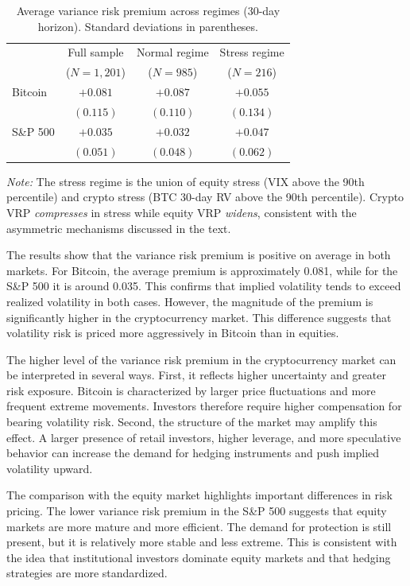 \documentclass[11pt,a4paper,openany]{report}
\begin{document}
\begin{table}[H]
\centering
\caption{Average variance risk premium across regimes (30-day horizon). Standard deviations in parentheses.}
\label{tab:vrp}
\begin{tabular}{lccc}
\toprule
& Full sample & Normal regime & Stress regime \\
& ($N=1{,}201$) & ($N=985$) & ($N=216$) \\
\midrule
Bitcoin   & $+0.081$  & $+0.087$  & $+0.055$ \\
          & $(0.115)$ & $(0.110)$ & $(0.134)$ \\
S\&P 500  & $+0.035$  & $+0.032$  & $+0.047$ \\
          & $(0.051)$ & $(0.048)$ & $(0.062)$ \\
\bottomrule
\end{tabular}
\begin{flushleft}\small
\textit{Note:} The stress regime is the union of equity stress (VIX above the 90th percentile) and crypto stress (BTC 30-day RV above the 90th percentile). Crypto VRP \emph{compresses} in stress while equity VRP \emph{widens}, consistent with the asymmetric mechanisms discussed in the text.
\end{flushleft}
\end{table}

The results show that the variance risk premium is positive on average
in both markets. For Bitcoin, the average premium is approximately
0.081, while for the S\&P 500 it is around 0.035. This confirms that
implied volatility tends to exceed realized volatility in both cases.
However, the magnitude of the premium is significantly higher in the
cryptocurrency market. This difference suggests that volatility risk is
priced more aggressively in Bitcoin than in equities.

The higher level of the variance risk premium in the cryptocurrency
market can be interpreted in several ways. First, it reflects higher
uncertainty and greater risk exposure. Bitcoin is characterized by
larger price fluctuations and more frequent extreme movements. Investors
therefore require higher compensation for bearing volatility risk.
Second, the structure of the market may amplify this effect. A larger
presence of retail investors, higher leverage, and more speculative
behavior can increase the demand for hedging instruments and push
implied volatility upward.

The comparison with the equity market highlights important differences
in risk pricing. The lower variance risk premium in the S\&P 500
suggests that equity markets are more mature and more efficient. The
demand for protection is still present, but it is relatively more stable
and less extreme. This is consistent with the idea that institutional
investors dominate equity markets and that hedging strategies are more
standardized.
\end{document}
